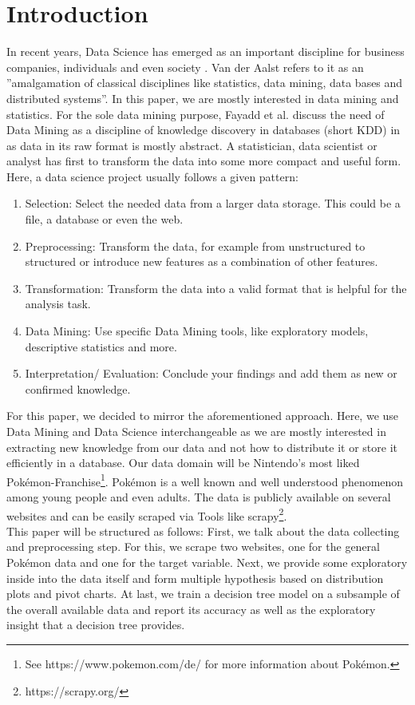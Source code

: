 \documentclass[conference]{IEEEtran}
\begin{document}
\section{Introduction}
In recent years, Data Science has emerged as an important discipline for business companies, individuals and even society \cite{aalst16}. Van der Aalst refers to it as an ''amalgamation of classical disciplines like statistics, data mining, data bases and distributed systems''. In this paper, we are mostly interested in data mining and statistics. For the sole data mining purpose, Fayadd et al. discuss the need of Data Mining as a discipline of knowledge discovery in databases (short KDD) in \cite{fayyad96} as data in its raw format is mostly abstract. A statistician, data scientist or analyst has first to transform the data into some more compact and useful form. Here, a data science project usually follows a given pattern:
\begin{enumerate}
	\item Selection: Select the needed data from a larger data storage. This could be a file, a database or even the web. 
	\item Preprocessing: Transform the data, for example from unstructured to structured or introduce new features as a combination of other features.
	\item Transformation: Transform the data into a valid format that is helpful for the analysis task.
	\item Data Mining: Use specific Data Mining tools, like exploratory models, descriptive statistics and more.
	\item Interpretation/ Evaluation: Conclude your findings and add them as new or confirmed knowledge.
\end{enumerate}
For this paper, we decided to mirror the aforementioned approach. Here, we use Data Mining and Data Science interchangeable as we are mostly interested in extracting new knowledge from our data and not how to distribute it or store it efficiently in a database. Our data domain will be Nintendo's most liked Pokémon-Franchise\footnote{See https://www.pokemon.com/de/ for more information about Pokémon.}. Pokémon is a well known and well understood phenomenon among young people and even adults. The data is publicly available on several websites and can be easily scraped via Tools like scrapy\footnote{https://scrapy.org/}.\\
This paper will be structured as follows: First, we talk about the data collecting and preprocessing step. For this, we scrape two websites, one for the general Pokémon data and one for the target variable. Next, we provide some exploratory inside into the data itself and form multiple hypothesis based on distribution plots and pivot charts. At last, we train a decision tree model on a subsample of the overall available data and report its accuracy as well as the exploratory insight that a decision tree provides.
\end{document}

